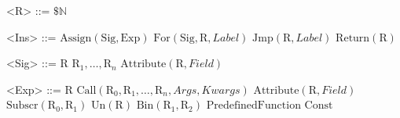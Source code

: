 
\newcommand{\R}[0]{\text{R}}
\begin{grammar}
  \let\syntleft\relax
  \let\syntright\relax
    <R> ::= $\$\mathbb{N}$ \alt {}
    
    <Ins> ::= $\text{Assign}(\text{Sig}, \text{Exp})$
         \alt $\text{For}(\text{Sig}, \R, Label)$
         \alt $\text{Jmp}(\R, Label)$
         \alt $\text{Return}(\R)$

    <Sig> ::= $\R$
         \alt $\R_1, \ldots, \R_n$
         \alt $\text{Attribute}(\R, Field)$
           
    <Exp> ::= $\R$
         \alt $\text{Call}(\R_0, \R_1, \ldots, \R_n, Args, Kwargs)$
         \alt $\text{Attribute}(\R, Field)$
         \alt $\text{Subscr}(\R_0, \R_1)$
         \alt $\text{Un}(\R)$
         \alt $\text{Bin}(\R_1, \R_2)$
         \alt $\text{PredefinedFunction}$
         \alt $\text{Const}$
\end{grammar}
